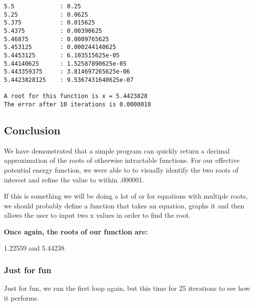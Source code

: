 \documentclass[11pt]{article}
\begin{document}
    \begin{Verbatim}[commandchars=\\\{\}]
5.5             : 0.25           
5.25            : 0.0625         
5.375           : 0.015625       
5.4375          : 0.00390625     
5.46875         : 0.0009765625   
5.453125        : 0.000244140625 
5.4453125       : 6.103515625e-05
5.44140625      : 1.52587890625e-05
5.443359375     : 3.814697265625e-06
5.4423828125    : 9.5367431640625e-07

A root for this function is x = 5.4423828
The error after 10 iterations is 0.0000010

    \end{Verbatim}

    \subsection{Conclusion}\label{conclusion}

We have demonstrated that a simple program can quickly return a decimal
approximation of the roots of otherwise intractable functions. For our
effective potential energy function, we were able to to visually
identify the two roots of interest and refine the value to within
.000001.

If this is something we will be doing a lot of or for equations with
multiple roots, we should probably define a function that takes an
equation, graphs it and then allows the user to input two x values in
order to find the root.

\textbf{Once again, the roots of our function are:}

1.22559 and 5.44238

    \subsubsection{Just for fun}\label{just-for-fun}

Just for fun, we run the first loop again, but this time for 25
iterations to see how it performs.
\end{document}
